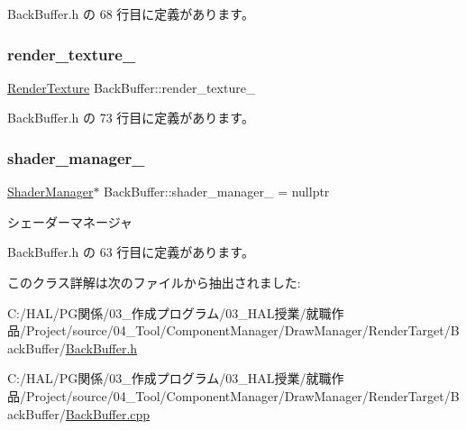  Back\+Buffer.\+h の 68 行目に定義があります。

\mbox{\label{class_back_buffer_ae6040bcf1ad445c54527b6d094453560}} 
\subsubsection{\texorpdfstring{render\+\_\+texture\+\_\+}{render\_texture\_}}
{\footnotesize\ttfamily \mbox{\hyperlink{class_render_texture}{Render\+Texture}} Back\+Buffer\+::render\+\_\+texture\+\_\+\hspace{0.3cm}{\ttfamily [private]}}



 Back\+Buffer.\+h の 73 行目に定義があります。

\mbox{\label{class_back_buffer_a559b286c9e1803110daddca158704696}} 
\subsubsection{\texorpdfstring{shader\+\_\+manager\+\_\+}{shader\_manager\_}}
{\footnotesize\ttfamily \mbox{\hyperlink{class_shader_manager}{Shader\+Manager}}$\ast$ Back\+Buffer\+::shader\+\_\+manager\+\_\+ = nullptr\hspace{0.3cm}{\ttfamily [private]}}



シェーダーマネージャ 



 Back\+Buffer.\+h の 63 行目に定義があります。



このクラス詳解は次のファイルから抽出されました\+:\begin{DoxyCompactItemize}
\item 
C\+:/\+H\+A\+L/\+P\+G関係/03\+\_\+作成プログラム/03\+\_\+\+H\+A\+L授業/就職作品/\+Project/source/04\+\_\+\+Tool/\+Component\+Manager/\+Draw\+Manager/\+Render\+Target/\+Back\+Buffer/\mbox{\hyperlink{_back_buffer_8h}{Back\+Buffer.\+h}}\item 
C\+:/\+H\+A\+L/\+P\+G関係/03\+\_\+作成プログラム/03\+\_\+\+H\+A\+L授業/就職作品/\+Project/source/04\+\_\+\+Tool/\+Component\+Manager/\+Draw\+Manager/\+Render\+Target/\+Back\+Buffer/\mbox{\hyperlink{_back_buffer_8cpp}{Back\+Buffer.\+cpp}}\end{DoxyCompactItemize}
